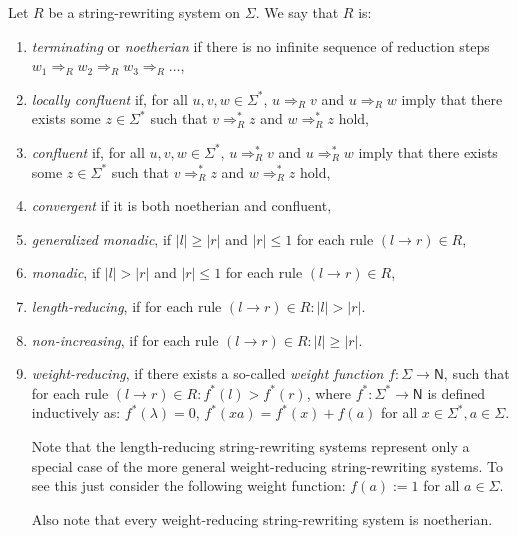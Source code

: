 \begin{definition}
Let $R$ be a string-rewriting system on $\Sigma$. We say that $R$ is:
\begin{enumerate}
\item {}\emph{terminating} or \emph{noetherian} if there is no infinite sequence of reduction steps $w_1 \Rightarrow_R w_2 \Rightarrow_R w_3 \Rightarrow_R \ldots$,
\item {}\emph{locally confluent} if, for all $u, v, w \in \Sigma^*$, $u \Rightarrow_R v$ and $u \Rightarrow_R w$ imply that there exists some $z \in \Sigma^*$ such that $v \Rightarrow_R^* z$ and $w \Rightarrow_R^* z$ hold,
\item {}\emph{confluent} if, for all $u, v, w \in \Sigma^*$, $u \Rightarrow_R^* v$ and $u \Rightarrow_R^* w$ imply that there exists some $z \in \Sigma^*$ such that $v \Rightarrow_R^* z$ and $w \Rightarrow_R^* z$ hold,
\item {}\emph{convergent} if it is both noetherian and confluent,
\item {}\emph{generalized monadic}, if $|l| \ge |r|$ and $|r|\le 1$ for each rule $(l \to r)\in R$,
\item {}\emph{monadic}, if $|l| > |r|$ and $|r|\le 1$ for each rule $(l \to r)\in R$,
\item {}\emph{length-reducing}, if for each rule $(l \to r) \in R: |l| > |r|$. 
\item {}\emph{non-increasing}, if for each rule $(l \to r) \in R: |l| \ge |r|$. 
\item {}\emph{weight-reducing}, if there exists a so-called \emph{weight function} $f: \Sigma \to \mathsf{N}$, such that for each rule $(l \to r) \in R: f^*(l) > f^*(r)$, where $f^*: \Sigma^* \to \mathsf{N}$ is defined inductively as: $f^*(\lambda) = 0$, $f^*(xa) = f^*(x) + f(a)$ for all $x \in \Sigma^*, a \in \Sigma$.

Note that the length-reducing string-rewriting systems represent only a special case of the more general weight-reducing string-rewriting systems. To see this just consider the following weight function: $f(a) := 1$ for all $a \in \Sigma$.

Also note that every weight-reducing string-rewriting system is noetherian.
\end{enumerate}
\end{definition}

